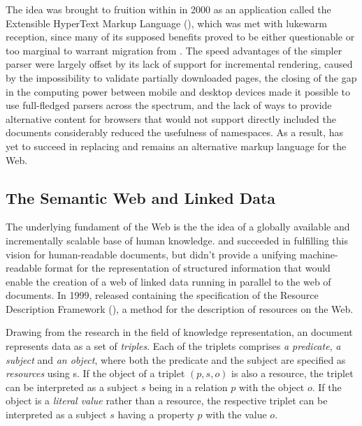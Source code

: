 \documentclass{book}
\begin{document}
        The idea was brought to fruition within \cite{pemberton00} in 2000 as an
         application called the Extensible HyperText Markup
        Language (), which was met with lukewarm reception, since
        many of its supposed benefits proved to be either questionable or too
        marginal to warrant migration from .  The speed advantages
        of the simpler parser were largely offset by its lack of support for
        incremental rendering, caused by the impossibility to validate partially
        downloaded pages, the closing of the gap in the computing power between
        mobile and desktop devices made it possible to use full-fledged
         parsers across the spectrum, and the lack of ways to
        provide alternative content for browsers that would not support directly
        included the  documents considerably reduced the usefulness
        of  namespaces. As a result,  has yet to
        succeed in replacing  and remains an alternative markup
        language for the Web.
        

      \subsection{The Semantic Web and Linked Data}
        The underlying fundament of the Web is the the idea of a globally
        available and incrementally scalable base of human knowledge.
         and  succeeded in fulfilling this vision
        for human-readable documents, but didn't provide a unifying
        machine-readable format for the representation of structured information
        that would enable the creation of a web of linked data running in
        parallel to the web of documents. In 1999,  released
        \cite{lassira99} containing the specification of the Resource
        Description Framework (), a method for the description of
        resources on the Web.

        Drawing from the research in the field of knowledge representation, an
         document represents data as a set of \emph{triples}. Each
        of the triplets comprises \emph{a predicate}, \emph{a subject} and
        \emph{an object}, where both the predicate and the subject are specified
        as \emph{resources} using s. If the object of a
        triplet $(p,s,o)$ is also a resource, the triplet can be interpreted as
        a subject $s$ being in a relation $p$ with the object $o$. If the object
        is a \emph{literal value} rather than a resource, the respective triplet
        can be interpreted as a subject $s$ having a property $p$ with the value
        $o$.
\end{document}
